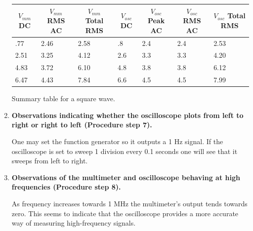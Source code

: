 \begin{enumerate}[resume]
\begin{maintable}[ht]
\center
\begin{tabular}{|l|l|l|l|l|l|l|}
\hline
\multicolumn{1}{|c|}{$V_{mm}$ DC} & \multicolumn{1}{c|}{$V_{mm}$ RMS AC} & \multicolumn{1}{c|}{$V_{mm}$ Total RMS} & \multicolumn{1}{c|}{$V_{osc}$ DC} & \multicolumn{1}{c|}{$V_{osc}$ Peak AC} & \multicolumn{1}{c|}{$V_{osc}$ RMS AC} & \multicolumn{1}{c|}{$V_{osc}$ Total RMS} \\ \hline
.77                               & 2.46                                 & 2.58                                    & .8                                & 2.4                                    & 2.4                                   & 2.53                                     \\ \hline
2.51                              & 3.25                                 & 4.12                                    & 2.6                               & 3.3                                    & 3.3                                   & 4.20                                     \\ \hline
4.83                              & 3.72                                 & 6.10                                    & 4.8                               & 3.8                                    & 3.8                                   & 6.12                                     \\ \hline
6.47                              & 4.43                                 & 7.84                                    & 6.6                               & 4.5                                    & 4.5                                   & 7.99                                     \\ \hline
\end{tabular}
\caption{Summary table for a square wave.}
\label{tab:accg8}
\end{maintable}

\item {\bf Observations indicating whether the oscilloscope plots from left to right or right to left (Procedure step 7).}\newline

One may set the function generator so it outputs a 1 Hz signal. If the oscilloscope is set to sweep 1 division every 0.1 seconds one will see that it sweeps from left to right.

\item {\bf Observations of the multimeter and oscilloscope behaving at high frequencies (Procedure step 8).}\newline

As frequency increases towards 1 MHz the multimeter's output tends towards zero. This seems to indicate that the oscilloscope provides a more accurate way of measuring high-frequency signals.
\end{enumerate}


